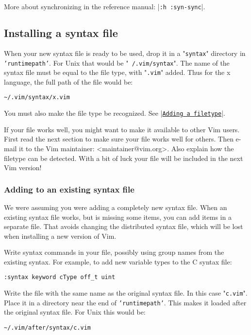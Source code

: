 More about synchronizing in the reference manual: |\texttt{:h :syn-sync}|.
\subsection{Installing a syntax file}
When your new syntax file is ready to be used, drop it in a "\texttt{syntax}" directory in \texttt{'runtimepath'}.
For Unix that would be "\texttt{~/.vim/syntax}".
The name of the syntax file must be equal to the file type, with "\texttt{.vim}" added.
Thus for the x language, the full path of the file would be:

\begin{Verbatim}[samepage=true]
    ~/.vim/syntax/x.vim 
\end{Verbatim}

You must also make the file type be recognized.
See |\hyperref[Adding a filetype]{\texttt{Adding a filetype}}|.

If your file works well, you might want to make it available to other Vim users.
First read the next section to make sure your file works well for others. Then e-mail it to the Vim maintainer: <maintainer@vim.org>. Also explain how the filetype can be detected.
With a bit of luck your file will be included in the next Vim version!

\subsubsection{Adding to an existing syntax file}
We were assuming you were adding a completely new syntax file.
When an existing syntax file works, but is missing some items, you can add items in a separate file.
That avoids changing the distributed syntax file, which will be lost when installing a new version of Vim.

Write syntax commands in your file, possibly using group names from the existing syntax.
For example, to add new variable types to the C syntax file:

\begin{Verbatim}[samepage=true]
 :syntax keyword cType off_t uint
\end{Verbatim}

Write the file with the same name as the original syntax file.
In this case "\texttt{c.vim}".
Place it in a directory near the end of \texttt{'runtimepath'}.
This makes it loaded after the original syntax file.
For Unix this would be:

\begin{Verbatim}[samepage=true]
    ~/.vim/after/syntax/c.vim 
\end{Verbatim}
